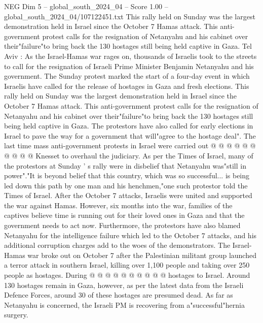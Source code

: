 \begin{textsample}{NEG Dim 5 – global\_south\_2024\_04 – Score 1.00 – global\_south\_2024\_04/107122451.txt}  \label{ex:f5_neg_181}
This rally held on Sunday was the largest demonstration held in Israel since the October 7 Hamas attack.
This anti-government protest calls for the resignation of Netanyahu and his cabinet over their"failure"to bring back the 130 hostages still being held captive in Gaza.
Tel Aviv : As the Israel-Hamas war rages on, thousands of Israelis took to the streets to call for the resignation of Israeli Prime Minister Benjamin Netanyahu and his government.
The Sunday protest marked the start of a four-day event in which Israelis have called for the release of hostages in Gaza and fresh elections.
This rally held on Sunday was the largest demonstration held in Israel since the October 7 Hamas attack.
This anti-government protest calls for the resignation of Netanyahu and his cabinet over their"failure"to bring back the 130 hostages still being held captive in Gaza.
The protestors have also called for early elections in Israel to pave the way for a government that will"agree to the hostage deal".
The last time mass anti-government protests in Israel were carried out @ @ @ @ @ @ @ @ @ @ Knesset to overhaul the judiciary.
As per the Times of Israel, many of the protestors at Sunday ' s rally were in disbelief that Netanyahu was"still in power"."It is beyond belief that this country, which was so successful... is being led down this path by one man and his henchmen,"one such protestor told the Times of Israel.
After the October 7 attacks, Israelis were united and supported the war against Hamas.
However, six months into the war, families of the captives believe time is running out for their loved ones in Gaza and that the government needs to act now.
Furthermore, the protestors have also blamed Netanyahu for the intelligence failure which led to the October 7 attacks, and his additional corruption charges add to the woes of the demonstrators.
The Israel-Hamas war broke out on October 7 after the Palestinian militant group launched a terror attack in southern Israel, killing over 1,100 people and taking over 250 people as hostages.
During @ @ @ @ @ @ @ @ @ @ hostages to Israel.
Around 130 hostages remain in Gaza, however, as per the latest data from the Israeli Defence Forces, around 30 of these hostages are presumed dead.
As far as Netanyahu is concerned, the Israeli PM is recovering from a"successful"hernia surgery.

\end{textsample}
